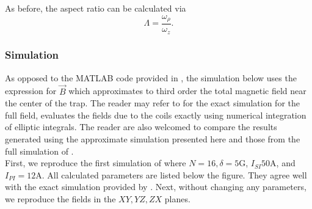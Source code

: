 \documentclass{book}
\theoremstyle{definition}
\newcommand{\f}[2]{\frac{#1}{#2}}
\begin{document}
As before, the aspect ratio can be calculated via
\begin{equation*}
\Lambda = \f{\omega_\rho}{\omega_z}.
\end{equation*}



\subsubsection*{Simulation}
As opposed to the MATLAB code provided in \cite{allcoil}, the simulation below uses the expression for $\vec{B}$ which approximates to third order the total magnetic field near the center of the trap. The reader may refer to \cite{allcoil} for the exact simulation for the full field, evaluates the fields due to the coils exactly using numerical integration of elliptic integrals. The reader are also welcomed to compare the results generated using the approximate simulation presented here and those from the full simulation of \cite{allcoil}.\\


First, we reproduce the first simulation of \cite{allcoil} where $N = 16, \delta = 5$G, $I_{SI} 50$A, and $I_{PI}=12$A. All calculated parameters are listed below the figure. They agree well with the exact simulation provided by \cite{allcoil}. Next, without changing any parameters, we reproduce the fields in the $XY,YZ,ZX$ planes.
\end{document}
